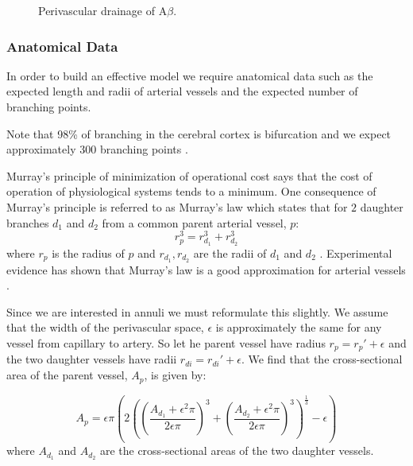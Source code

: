 \documentclass[12pt]{article} %
\theoremstyle{definition}
\begin{document}
\begin{figure}[H]

              \centering
                \caption{Perivascular drainage of A$\beta$.}
\end{figure}
\subsubsection{Anatomical Data}


 
In order to build an effective model we require anatomical data such as the expected length and radii of arterial vessels and the expected number of branching points.     

Note that 98\% of branching in the cerebral cortex is bifurcation and we expect approximately 300 branching points \cite{Cassot}. 

Murray's principle of minimization of operational cost says that the cost of operation of physiological systems tends to a minimum.  One consequence of Murray’s principle is referred to as Murray's law which states that for $2$ daughter branches $d_{1}$ and $d_{2}$ from a common parent arterial vessel, $p$: 
\[r_{p}^{3} = r_{d_{1}}^{3} + r_{d_{2}}^{3}\]
where $r_{p}$ is the radius of $p$ and $r_{d_{1}},r_{d_{2}}$ are the radii of $d_{1}$ and $d_{2}$ \cite{Murray}.
Experimental evidence has shown that Murray's law is a good approximation for arterial vessels \cite{}.

Since we are interested in annuli we must reformulate this slightly. We assume that the width of the perivascular space, $\epsilon$ is approximately the same for any vessel from capillary to artery.  So let he parent vessel have radius $r_{p} = r_{p}' + \epsilon$ and the two daughter vessels have radii $r_{di} = r_{di}' + \epsilon$.
We find that the cross-sectional area of the parent vessel, $A_{p}$, is given by:

\begin{equation}
A_{p} = \epsilon \pi \left( 2 \left(\left( \frac{A_{d_{1}} + \epsilon^{2}\pi}{2\epsilon\pi}\right)^{3} + \left( \frac{A_{d_{2}} + \epsilon^{2}\pi}{2\epsilon\pi}\right)^{3}\right)^\frac{1}{3} - \epsilon \right)
\end{equation}
where $A_{d_{1}}$ and $A_{d_{2}}$ are the cross-sectional areas of the two daughter vessels.
\end{document}
